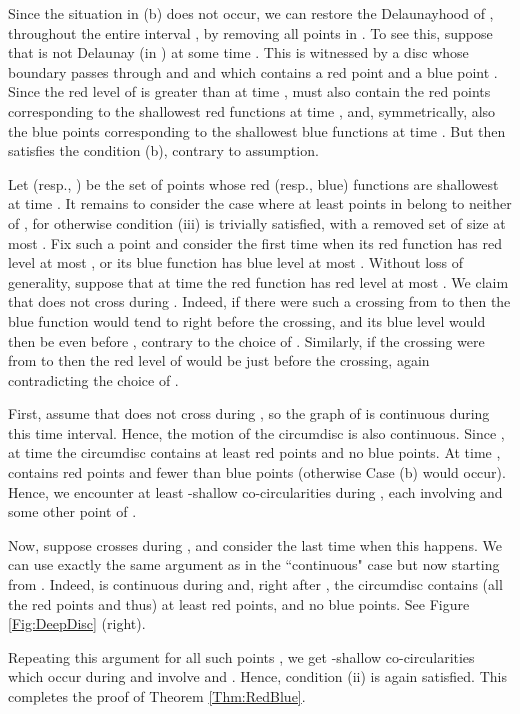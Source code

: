 \documentclass[letter,11pt]{article}
\begin{document}
Since the situation in (b) does not occur, we can restore the Delaunayhood of , throughout the entire interval , by removing all points in . To see this, suppose that  is not Delaunay (in ) at some time . This is witnessed by a disc  whose boundary passes through  and  and which contains a red point  and a blue point . Since the red level of  is greater than  at time ,  must also contain the  red points corresponding to the  shallowest red functions at time , and, symmetrically, also the  blue points corresponding to the  shallowest blue functions at time . But then  satisfies the condition (b), contrary to assumption. 



Let  (resp., ) be the set of  points whose red (resp., blue) functions are shallowest at time .
It remains to consider the case where at least  points  in  belong to neither of , for otherwise condition (iii) is trivially satisfied, with a removed set of size at most .
Fix such a point  and consider the first time  when its red function  has red level at most , or its blue function  has blue level at most . Without loss of generality, suppose that at time  the red function  has red level at most .
We claim that  does not cross  during . Indeed, if there were such a crossing from  to  then the blue function  would tend to  right before the crossing, and its blue level would then be  even before , contrary to the choice of . Similarly, if the crossing were from  to  then the red level of  would be  just before the crossing, again contradicting the choice of . 

First, assume that  does not cross  during , so the graph of  is continuous during this time interval. Hence, the motion of the circumdisc  is also continuous.
Since , at time  the circumdisc  contains at least  red points and no blue points. At time ,
 contains  red points and fewer than  blue points (otherwise Case (b) would occur). 
Hence, we encounter at least  -shallow co-circularities during , each involving  and some other point of .


Now, suppose  crosses  during , and consider the last time  when this happens.
We can use exactly the same argument as in the ``continuous" case but now starting from . Indeed,  is continuous during  and, right after , the circumdisc  contains (all the red points and thus) at least  red points, and no blue points. See Figure \ref{Fig:DeepDisc} (right).


Repeating this argument for all such points , we get  -shallow co-circularities which occur during  and involve  and . Hence, condition (ii) is again satisfied. This completes the proof of Theorem \ref{Thm:RedBlue}. 
\end{document}
